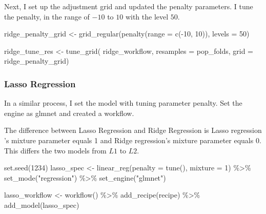 \documentclass[
]{article}
\newenvironment{Shaded}{\begin{snugshade}}{\end{snugshade}}
\newcommand{\AttributeTok}[1]{\textcolor[rgb]{0.77,0.63,0.00}{#1}}
\newcommand{\DecValTok}[1]{\textcolor[rgb]{0.00,0.00,0.81}{#1}}
\newcommand{\FunctionTok}[1]{\textcolor[rgb]{0.00,0.00,0.00}{#1}}
\newcommand{\NormalTok}[1]{#1}
\newcommand{\OtherTok}[1]{\textcolor[rgb]{0.56,0.35,0.01}{#1}}
\newcommand{\SpecialCharTok}[1]{\textcolor[rgb]{0.00,0.00,0.00}{#1}}
\newcommand{\StringTok}[1]{\textcolor[rgb]{0.31,0.60,0.02}{#1}}
\begin{document}
Next, I set up the adjustment grid and updated the penalty parameters. I
tune the penalty, in the range of \(-10\) to \(10\) with the level
\(50\).

\begin{Shaded}
\begin{Highlighting}[]
\NormalTok{ridge\_penalty\_grid }\OtherTok{\textless{}{-}} \FunctionTok{grid\_regular}\NormalTok{(}\FunctionTok{penalty}\NormalTok{(}\AttributeTok{range =} \FunctionTok{c}\NormalTok{(}\SpecialCharTok{{-}}\DecValTok{10}\NormalTok{, }\DecValTok{10}\NormalTok{)), }\AttributeTok{levels =} \DecValTok{50}\NormalTok{)}

\NormalTok{ridge\_tune\_res }\OtherTok{\textless{}{-}} \FunctionTok{tune\_grid}\NormalTok{(}
\NormalTok{  ridge\_workflow,}
  \AttributeTok{resamples =}\NormalTok{ pop\_folds, }
  \AttributeTok{grid =}\NormalTok{ ridge\_penalty\_grid)}
\end{Highlighting}
\end{Shaded}

\hypertarget{lasso-regression}{%
\subsubsection{Lasso Regression}\label{lasso-regression}}

In a similar process, I set the model with tuning parameter penalty. Set
the engine as glmnet and created a workflow.

The difference between Lasso Regression and Ridge Regression is Lasso
regression 's mixture parameter equals 1 and Ridge regression's mixture
parameter equals 0. This differs the two models from \(L1\) to \(L2\).

\begin{Shaded}
\begin{Highlighting}[]
\FunctionTok{set.seed}\NormalTok{(}\DecValTok{1234}\NormalTok{)}
\NormalTok{lasso\_spec }\OtherTok{\textless{}{-}} 
  \FunctionTok{linear\_reg}\NormalTok{(}\AttributeTok{penalty =} \FunctionTok{tune}\NormalTok{(), }\AttributeTok{mixture =} \DecValTok{1}\NormalTok{) }\SpecialCharTok{\%\textgreater{}\%} 
  \FunctionTok{set\_mode}\NormalTok{(}\StringTok{"regression"}\NormalTok{) }\SpecialCharTok{\%\textgreater{}\%} 
  \FunctionTok{set\_engine}\NormalTok{(}\StringTok{"glmnet"}\NormalTok{) }

\NormalTok{lasso\_workflow }\OtherTok{\textless{}{-}} \FunctionTok{workflow}\NormalTok{() }\SpecialCharTok{\%\textgreater{}\%} 
  \FunctionTok{add\_recipe}\NormalTok{(recipe) }\SpecialCharTok{\%\textgreater{}\%} 
  \FunctionTok{add\_model}\NormalTok{(lasso\_spec)}
\end{Highlighting}
\end{Shaded}
\end{document}
